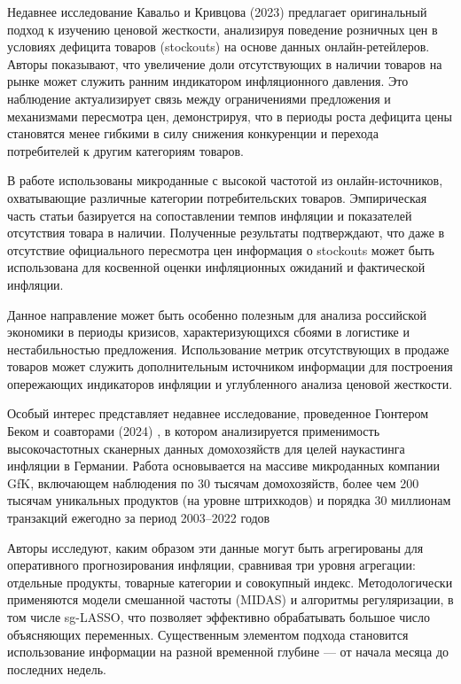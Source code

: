 Недавнее исследование Кавальо и Кривцова (2023) \cite{cavallo2023stockouts} предлагает оригинальный подход к изучению ценовой жесткости, анализируя поведение розничных цен в условиях дефицита товаров (stockouts) на основе данных онлайн-ретейлеров. Авторы показывают, что увеличение доли отсутствующих в наличии товаров на рынке может служить ранним индикатором инфляционного давления. Это наблюдение актуализирует связь между ограничениями предложения и механизмами пересмотра цен, демонстрируя, что в периоды роста дефицита цены становятся менее гибкими в силу снижения конкуренции и перехода потребителей к другим категориям товаров.

В работе использованы микроданные с высокой частотой из онлайн-источников, охватывающие различные категории потребительских товаров. Эмпирическая часть статьи базируется на сопоставлении темпов инфляции и показателей отсутствия товара в наличии. Полученные результаты подтверждают, что даже в отсутствие официального пересмотра цен информация о stockouts может быть использована для косвенной оценки инфляционных ожиданий и фактической инфляции.

Данное направление может быть особенно полезным для анализа российской экономики в периоды кризисов, характеризующихся сбоями в логистике и нестабильностью предложения. Использование метрик отсутствующих в продаже товаров может служить дополнительным источником информации для построения опережающих индикаторов инфляции и углубленного анализа ценовой жесткости.

Особый интерес представляет недавнее исследование, проведенное Гюнтером Беком и соавторами (2024) \cite{beck2024nowcasting}, в котором анализируется применимость высокочастотных сканерных данных домохозяйств для целей наукастинга инфляции в Германии. Работа основывается на массиве микроданных компании GfK, включающем наблюдения по 30 тысячам домохозяйств, более чем 200 тысячам уникальных продуктов (на уровне штрихкодов) и порядка 30 миллионам транзакций ежегодно за период 2003–2022 годов

Авторы исследуют, каким образом эти данные могут быть агрегированы для оперативного прогнозирования инфляции, сравнивая три уровня агрегации: отдельные продукты, товарные категории и совокупный индекс. Методологически применяются модели смешанной частоты (MIDAS) и алгоритмы регуляризации, в том числе sg-LASSO, что позволяет эффективно обрабатывать большое число объясняющих переменных. Существенным элементом подхода становится использование информации на разной временной глубине — от начала месяца до последних недель.

